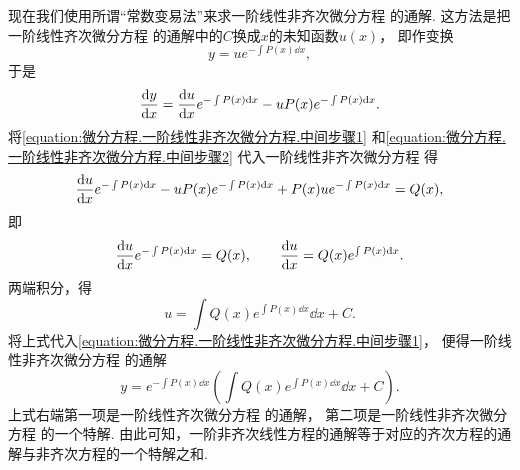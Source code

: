 现在我们使用所谓“常数变易法”来求一阶线性非齐次微分方程  的通解.
这方法是把一阶线性齐次微分方程  的通解中的\(C\)换成\(x\)的未知函数\(u(x)\)，
即作变换\begin{equation}\label{equation:微分方程.一阶线性非齐次微分方程.中间步骤1}
	y = u e^{ -\int P(x)\dd{x} },
\end{equation}
于是\begin{equation}\label{equation:微分方程.一阶线性非齐次微分方程.中间步骤2}
	\dv{y}{x} = \dv{u}{x} e^{ -\int P(x) \dd{x} } - u P(x) e^{ -\int P(x) \dd{x} }.
\end{equation}
将\cref{equation:微分方程.一阶线性非齐次微分方程.中间步骤1}
和\cref{equation:微分方程.一阶线性非齐次微分方程.中间步骤2}
代入一阶线性非齐次微分方程 
得\begin{equation*}
	\dv{u}{x} e^{ -\int P(x) \dd{x} }
	- u P(x) e^{ -\int P(x) \dd{x} }
	+ P(x) u e^{ -\int P(x) \dd{x} }
	= Q(x),
\end{equation*}
即\begin{equation*}
	\dv{u}{x} e^{ -\int P(x) \dd{x} } = Q(x),
	\qquad
	\dv{u}{x} = Q(x) e^{ \int P(x) \dd{x} }.
\end{equation*}
两端积分，得\begin{equation*}
	u = \int Q(x) e^{ \int P(x) \dd{x} } \dd{x} + C.
\end{equation*}
将上式代入\cref{equation:微分方程.一阶线性非齐次微分方程.中间步骤1}，
便得一阶线性非齐次微分方程  的通解\begin{equation}\label{equation:微分方程.一阶线性非齐次微分方程的通解}
	y = e^{ -\int P(x) \dd{x} } \left( \int Q(x) e^{ \int P(x) \dd{x} } \dd{x} + C \right).
\end{equation}
上式右端第一项是一阶线性齐次微分方程  的通解，
第二项是一阶线性非齐次微分方程  的一个特解.
由此可知，一阶非齐次线性方程的通解等于对应的齐次方程的通解与非齐次方程的一个特解之和.

